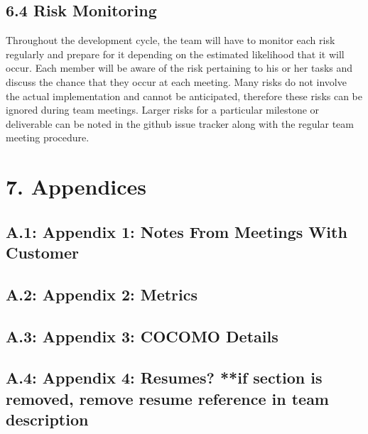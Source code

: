 \documentclass[]{article}
\begin{document}
\subsection{6.4 Risk Monitoring}\label{risk-monitoring}

Throughout the development cycle, the team will have to monitor each
risk regularly and prepare for it depending on the estimated likelihood
that it will occur. Each member will be aware of the risk pertaining to
his or her tasks and discuss the chance that they occur at each meeting.
Many risks do not involve the actual implementation and cannot be
anticipated, therefore these risks can be ignored during team meetings.
Larger risks for a particular milestone or deliverable can be noted in
the github issue tracker along with the regular team meeting procedure.

\section{7. Appendices}\label{appendices}

\subsection{A.1: Appendix 1: Notes From Meetings With
Customer}\label{a.1-appendix-1-notes-from-meetings-with-customer}

\subsection{A.2: Appendix 2: Metrics}\label{a.2-appendix-2-metrics}

\subsection{A.3: Appendix 3: COCOMO
Details}\label{a.3-appendix-3-cocomo-details}

\subsection{A.4: Appendix 4: Resumes? **if section is removed, remove
resume reference in team
description}\label{a.4-appendix-4-resumes-if-section-is-removed-remove-resume-reference-in-team-description}
\end{document}
